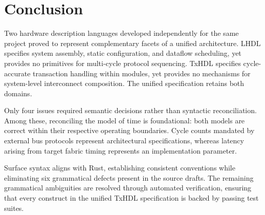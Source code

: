 \section{Conclusion}
\label{sec:conclusion}

Two hardware description languages developed independently for the same
project proved to represent complementary facets of a unified architecture.
LHDL specifies system assembly, static configuration, and dataflow scheduling,
yet provides no primitives for multi-cycle protocol sequencing. TxHDL specifies
cycle-accurate transaction handling within modules, yet provides no mechanisms
for system-level interconnect composition. The unified specification retains
both domains.

Only four issues required semantic decisions rather than syntactic reconciliation.
Among these, reconciling the model of time is foundational: both models are
correct within their respective operating boundaries. Cycle counts mandated by
external bus protocols represent architectural specifications, whereas latency
arising from target fabric timing represents an implementation parameter.

Surface syntax aligns with Rust, establishing consistent conventions while
eliminating six grammatical defects present in the source drafts. The remaining
grammatical ambiguities are resolved through automated verification, ensuring
that every construct in the unified TxHDL specification is backed by passing
test suites.
